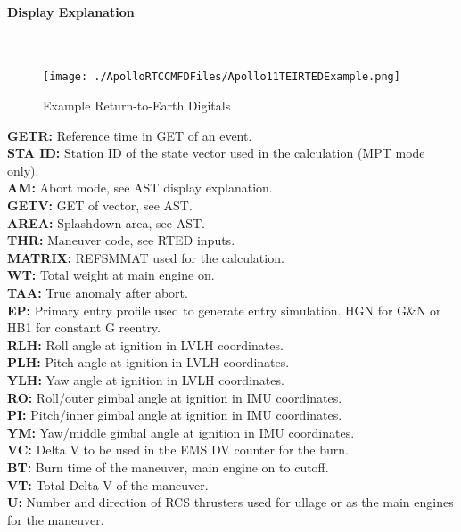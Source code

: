\documentclass[11pt]{article} %
\begin{document}
\paragraph{Display Explanation}\mbox{} \\

\begin{figure}[hp]
	\centering
		\texttt{[image: ./ApolloRTCCMFDFiles/Apollo11TEIRTEDExample.png]}
	\caption{Example Return-to-Earth Digitals}
	\label{fig:Apollo11TEIRTEDExample}
\end{figure}

\textbf{GETR:} Reference time in GET of an event.\\
\textbf{STA ID:} Station ID of the state vector used in the calculation (MPT mode only).\\
\textbf{AM:} Abort mode, see AST display explanation.\\
\textbf{GETV:} GET of vector, see AST.\\
\textbf{AREA:} Splashdown area, see AST.\\
\textbf{THR:} Maneuver code, see RTED inputs.\\
\textbf{MATRIX:} REFSMMAT used for the calculation.\\
\textbf{WT:} Total weight at main engine on.\\
\textbf{TAA:} True anomaly after abort.\\
\textbf{EP:} Primary entry profile used to generate entry simulation. HGN for G\&N or HB1 for constant G reentry.\\
\textbf{RLH:} Roll angle at ignition in LVLH coordinates.\\ 
\textbf{PLH:} Pitch angle at ignition in LVLH coordinates.\\ 
\textbf{YLH:} Yaw angle at ignition in LVLH coordinates.\\ 
\textbf{RO:} Roll/outer gimbal angle at ignition in IMU coordinates.\\
\textbf{PI:} Pitch/inner gimbal angle at ignition in IMU coordinates.\\
\textbf{YM:} Yaw/middle gimbal angle at ignition in IMU coordinates.\\
\textbf{VC:} Delta V to be used in the EMS DV counter for the burn.\\
\textbf{BT:} Burn time of the maneuver, main engine on to cutoff.\\
\textbf{VT:} Total Delta V of the maneuver.\\
\textbf{U:} Number and direction of RCS thrusters used for ullage or as the main engines for the maneuver.\\
\end{document}

